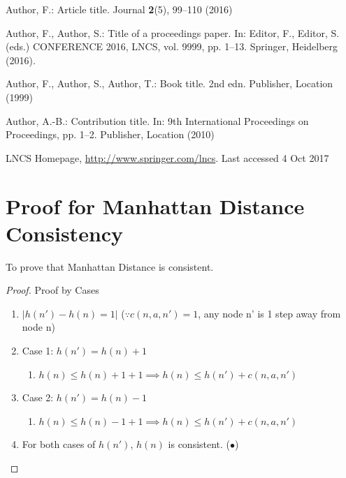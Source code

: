 \documentclass[runningheads]{llncs}
\begin{document}
\begin{thebibliography}{8}
Author, F.: Article title. Journal \textbf{2}(5), 99--110 (2016)

Author, F., Author, S.: Title of a proceedings paper. In: Editor,
F., Editor, S. (eds.) CONFERENCE 2016, LNCS, vol. 9999, pp. 1--13.
Springer, Heidelberg (2016). 

Author, F., Author, S., Author, T.: Book title. 2nd edn. Publisher,
Location (1999)

Author, A.-B.: Contribution title. In: 9th International Proceedings
on Proceedings, pp. 1--2. Publisher, Location (2010)

LNCS Homepage, \url{http://www.springer.com/lncs}. Last accessed 4
Oct 2017
\end{thebibliography}

\appendix
\section{Proof for Manhattan Distance Consistency}
\label{appendix:manhat_cons}

To prove that Manhattan Distance is consistent.
\begin{proof} Proof by Cases
    \begin{enumerate}
        \item \( |h(n') - h(n) = 1| \) (\( \because c(n, a, n') = 1 \), any node n' is 1 step away from node n)
        \item Case 1: \( h(n') = h(n) + 1 \)
        \begin{enumerate}
            \item \( h(n) \leq h(n) + 1 + 1 \implies h(n) \leq h(n') + c(n, a, n') \)
        \end{enumerate}
        \item Case 2: \( h(n') = h(n) - 1 \)
        \begin{enumerate}
            \item \( h(n) \leq h(n) - 1 + 1 \implies h(n) \leq h(n') + c(n, a, n') \)
        \end{enumerate}
        \item For both cases of \( h(n') \), \( h(n) \) is consistent. (\(\bullet\))
    \end{enumerate}
\end{proof}
\end{document}
